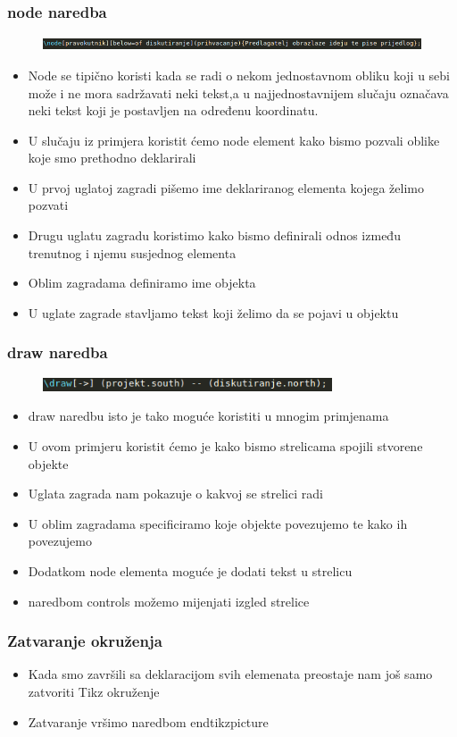 \documentclass{beamer}
\begin{document}
	\begin{frame}
	\frametitle{node naredba}
		\begin{figure}
			\begin{center}
				\includegraphics[width=12 cm,height=0.4cm]{Slike/node.png}
			\end{center}
		\end{figure}
		\begin{itemize}
		\item Node se tipično koristi kada se radi o nekom jednostavnom obliku koji u sebi može i ne mora sadržavati neki tekst,a u najjednostavnijem slučaju označava neki tekst koji je postavljen na određenu koordinatu.
		\item U slučaju iz primjera koristit ćemo node element kako bismo pozvali oblike koje smo prethodno deklarirali
		\item U prvoj uglatoj zagradi pišemo ime deklariranog elementa kojega želimo pozvati
		\item Drugu uglatu zagradu koristimo kako bismo definirali odnos između trenutnog i njemu susjednog elementa
		\item Oblim zagradama definiramo ime objekta
		\item U uglate zagrade stavljamo tekst koji želimo da se pojavi u objektu
  		\end{itemize}	
	\end{frame}

		\begin{frame}
	\frametitle{draw naredba}
		\begin{figure}
			\begin{center}
				\includegraphics[width=12 cm,height=0.4cm]{Slike/draw.png}
			\end{center}
		\end{figure}
		\begin{itemize}
		\item draw naredbu isto je tako moguće koristiti u mnogim primjenama
		\item U ovom primjeru koristit ćemo je kako bismo strelicama spojili stvorene objekte
		\item Uglata zagrada nam pokazuje o kakvoj se strelici radi 
		\item U oblim zagradama specificiramo koje objekte povezujemo te kako ih povezujemo
		\item Dodatkom node elementa moguće je dodati tekst u strelicu 
		\item naredbom controls možemo mijenjati izgled strelice
  		\end{itemize}	
	\end{frame}

	\begin{frame}
	\frametitle{Zatvaranje okruženja}
		\begin{itemize}
		\item Kada smo završili sa deklaracijom svih elemenata preostaje nam još samo zatvoriti Tikz okruženje
		\item Zatvaranje vršimo naredbom end{tikzpicture}
  		\end{itemize}	
	\end{frame}	
\end{document}

